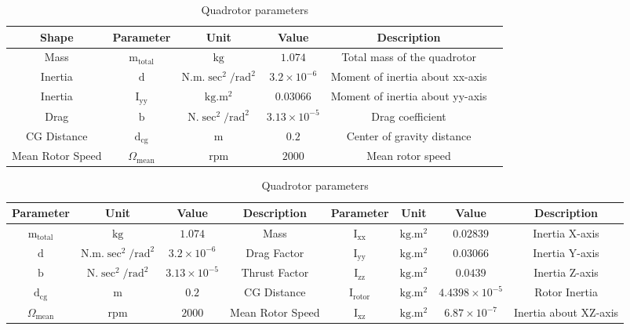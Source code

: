 \documentclass[3p]{elsarticle}
\begin{document}
\begin{table}[H]
    \centering
    \caption{Quadrotor parameters}
    \vspace{-0.5cm}
    \renewcommand{\arraystretch}{1.3}
    \begin{center}
    \begin{tabular}{c c c c c c}
    \hline
    Shape & Parameter & Unit & Value & Description \\
    \hline
    Mass & $\mathrm{m}_{\text{total}}$ & $\mathrm{kg}$ & $1.074$ & Total mass of the quadrotor \\ 
    Inertia & $\mathrm{d}$ & $\mathrm{N.m.\sec^2/rad^2}$ & $3.2\times10^{-6}$ & Moment of inertia about xx-axis \\
    Inertia & $\mathrm{I}_{\text{yy}}$ & $\mathrm{kg.m^2}$ & $0.03066$ & Moment of inertia about yy-axis \\
    Drag & $\mathrm{b}$ & $\mathrm{N.\sec^2/rad^2}$ & $3.13\times10^{-5}$ & Drag coefficient \\
    CG Distance & $\mathrm{d}_{\text{cg}}$ & $\mathrm{m}$ & $0.2$ & Center of gravity distance \\
    Mean Rotor Speed & $\Omega_{\text{mean}}$ & $\mathrm{rpm}$ & $2000$ & Mean rotor speed \\
    \hline
\end{tabular}
\label{tab:parameters}
\end{center}
\end{table}


\begin{table}[H]
    \centering
    \caption{Quadrotor parameters}
    \vspace{-0.5cm}
    \renewcommand{\arraystretch}{1.3}
    \begin{center}
    \begin{tabular}{cccccccc}
    \hline
    Parameter & Unit & Value & Description & Parameter & Unit & Value & Description \\
    \hline
    $\mathrm{m}_{\text{total}}$ & $\mathrm{kg}$ & $1.074$ & Mass & $\mathrm{I}_{\text{xx}}$ & $\mathrm{kg.m^2}$ & $0.02839$ & Inertia X-axis \\ 
    $\mathrm{d}$ & $\mathrm{N.m.\sec^2/rad^2}$ & $3.2\times10^{-6}$ & Drag Factor &
    $\mathrm{I}_{\text{yy}}$ & $\mathrm{kg.m^2}$ & $0.03066$ & Inertia Y-axis \\
    $\mathrm{b}$ & $\mathrm{N.\sec^2/rad^2}$ & $3.13\times10^{-5}$ & Thrust Factor &
    $\mathrm{I}_{\text{zz}}$ & $\mathrm{kg.m^2}$ & $0.0439$ & Inertia Z-axis \\
    $\mathrm{d}_{\text{cg}}$ & $\mathrm{m}$ & $0.2$ & CG Distance &
    $\mathrm{I}_{\text{rotor}}$ & $\mathrm{kg.m^2}$ & $4.4398\times 10^{-5}$ & Rotor Inertia\\
    $\Omega_{\text{mean}}$ & $\mathrm{rpm}$ & $2000$ & Mean Rotor Speed &
    $\mathrm{I}_{\text{xz}}$ & $\mathrm{kg.m^2}$ & $6.87\times 10^{-7}$ & Inertia about XZ-axis \\
    \hline
\end{tabular}
\label{tab:parameters}
\end{center}
\end{table}
\end{document}
